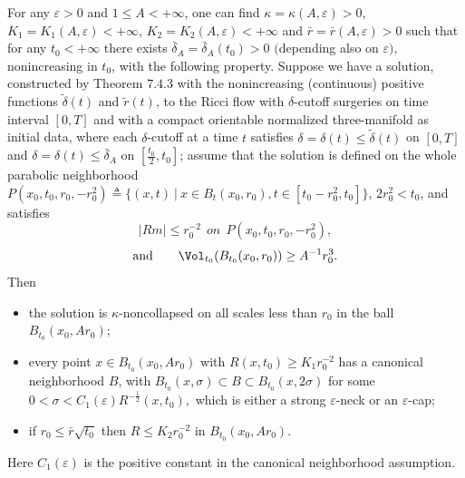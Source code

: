 \begin{theorem}
  \label{thm:cz-bounded-time-surgery-curvature-estimate}

For any $\varepsilon > 0$ and  $1 \leq A<+\infty$, one can find
$\kappa=\kappa(A,\varepsilon)>0$,
$K_1=K_1(A,\varepsilon)<+\infty$, $K_2=K_2(A,\varepsilon)<+\infty$
and $\bar{r}=\bar{r}(A,\varepsilon)>0$ such that for any
$t_0<+\infty$ there exists $\bar{\delta}_A=\bar{\delta}_A(t_0)>0$
$($depending also on $\varepsilon),$ nonincreasing in $t_0$, with
the following property. Suppose we have a solution, constructed by
Theorem $7.4.3$ with the nonincreasing (continuous) positive
functions $\widetilde{\delta}(t)$ and $\widetilde{r}(t)$, to the
Ricci flow with $\delta$-cutoff surgeries on time interval $[0,T]$
and with a compact orientable normalized three-manifold as initial
data, where each $\delta$-cutoff at a time $t$ satisfies
$\delta=\delta(t) \leq \widetilde{\delta}(t)$ on $[0,T]$ and
$\delta=\delta(t) \leq \bar{\delta}_A$ on $[\frac{t_0}{2},t_0]$;
assume that the solution is defined on the whole parabolic
neighborhood $P(x_0,t_0,r_0,-r^2_0)\triangleq\{(x,t)\ |\ x\in
B_t(x_0,r_0),t\in[t_0-r^2_0,t_0]\}$, $2r^2_0<t_0$, and satisfies
$$
|Rm|\leq r^{-2}_0 \ \ on \ \ P(x_0,t_0,r_0,-r^2_0),
$$
$$
\text{and} \qquad \Vol_{t_0}(B_{t_0}(x_0,r_0))\geq A^{-1}r^3_0.
$$
Then
\begin{itemize}
\item[(i)] the solution is $\kappa$-noncollapsed on all scales
less than $r_0$ in the ball $B_{t_0}(x_0,Ar_0)$; \item[(ii)] every
point $x\in B_{t_0}(x_0,Ar_0)$ with $R(x,t_0)\geq K_1r^{-2}_0$ has
a canonical neighborhood $B$, with $ B_{t_0}(x,\sigma)\subset
B\subset B_{t_0}(x,2\sigma)$ for some
$0<\sigma<C_1(\varepsilon)R^{-\frac{1}{2}}(x,t_0), $ which is
either a strong $\varepsilon$-neck or an $\varepsilon$-cap;
\item[(iii)] if $r_0\leq \bar{r}\sqrt{t_0}$ then $R\leq
K_2r^{-2}_0$ in $B_{t_0}(x_0,Ar_0)$.
\end{itemize}
Here $C_1(\varepsilon)$ is the positive constant in the canonical
neighborhood assumption.

\end{theorem}
